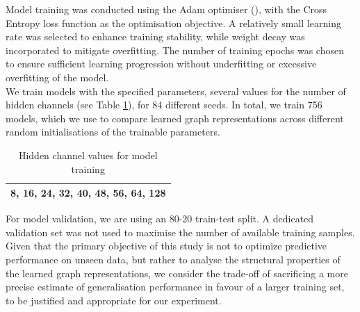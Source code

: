 \noindent 
Model training was conducted using the Adam optimiser (\cite{adamoptim}), with the Cross Entropy loss function as the optimisation objective. A relatively small learning rate was selected to enhance training stability, while weight decay was incorporated to mitigate overfitting. The number of training epochs was chosen to ensure sufficient learning progression without underfitting or excessive overfitting of the model.
\vspace{0.5em}\\
We train models with the specified parameters, several values for the number of hidden channels (see Table \ref{tab:hid_chans}), for 84 different seeds. In total, we train 756 models, which we use to compare learned graph representations across different random initialisations of the trainable parameters.

\begin{table}[!ht]
    \centering
    \begin{tabular}{|c|}
        \hline
        8, 16, 24, 32, 40, 48, 56, 64, 128\\
        \hline
    \end{tabular}
    \caption{Hidden channel values for model training}
    \label{tab:hid_chans}
\end{table}

\noindent For model validation, we are using an 80-20 train-test split. A dedicated validation set was not used to maximise the number of available training samples. Given that the primary objective of this study is not to optimize predictive performance on unseen data, but rather to analyse the structural properties of the learned graph representations, we consider the trade-off of sacrificing a more precise estimate of generalisation performance in favour of a larger training set, to be justified and appropriate for our experiment. 
